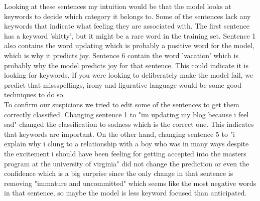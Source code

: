 Looking at these sentences my intuition would be that the model looks at keywords to decide which category it belongs to. Some of the sentences lack any keywords that indicate what feeling they are associated with. The first sentence has a keyword 'shitty', but it might be a rare word in the training set. Sentence 1 also contains the word updating which is probably a positive word for the model, which is why it predicts joy. Sentence 6 contain the word 'vacation' which is probably why the model predicts joy for that sentence. This could indicate it is looking for keywords. If you were looking to deliberately make the model fail, we predict that missspellings, irony and figurative language would be some good techniques to do so.
\\

To confirm our suspicions we tried to edit some of the sentences to get them correctly classified.
Changing sentence 1 to "im updating my blog because i feel sad" changed the classification to sadness which is the correct one. This indicates that keywords are important. On the other hand, changing sentence 5 to "i explain why i clung to a relationship with a boy who was in many ways despite the excitement i should have been feeling for getting accepted into the masters program at the university of virginia" did not change the prediction or even the confidence which is a big surprise since the only change in that sentence is removing "immature and uncommitted" which seems like the most negative words in that sentence, so maybe the model is less keyword focused than anticipated.\\